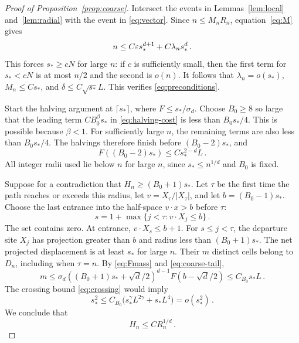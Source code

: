 \begin{proof}[Proof of Proposition~\ref{prop:coarse}]
Intersect the events in Lemmas~\ref{lem:local} and~\ref{lem:radial}
with the event in \eqref{eq:vector}.
Since $n\leq M_nR_n$, equation~\eqref{eq:M} gives
\begin{equation}\label{eq:sstar-lower}
n\leq C\varepsilon s_*^{d+1}+C\lambda_ns_*^d\, .
\end{equation}
This forces $s_*\geq cN$ for large $n$: if $c$ is sufficiently small,
then the first term for $s_*<cN$ is at most $n/2$ and the second is $o(n)$.
It follows that $\lambda_n=o(s_*)$, $M_n\leq Cs_*$, and
$\delta\leq C\sqrt{s_*}L$. This verifies \eqref{eq:preconditions}.

Start the halving argument at $\lceil s_*\rceil$, where
$F\leq s_*/\sigma_d$.
Choose $B_0\geq8$ so large that the leading term
$CB_0^\beta s_*$ in \eqref{eq:halving-cost} is less than $B_0s_*/4$.
This is possible because $\beta<1$.
For sufficiently large $n$, the remaining terms are also less than
$B_0s_*/4$. The halvings therefore finish before $(B_0-2)s_*$, and
\begin{equation}\label{eq:coarse-tail}
F((B_0-2)s_*)\leq Cs_*^{2-d}L\, .
\end{equation}
All integer radii used lie below $n$ for large $n$, since
$s_*\leq n^{1/d}$ and $B_0$ is fixed.

Suppose for a contradiction that $H_n\geq(B_0+1)s_*$.
Let $\tau$ be the first time the path reaches or exceeds this radius, let
$v=X_\tau/|X_\tau|$, and let $b=(B_0-1)s_*$.
Choose the last entrance into the half-space $v\cdot x>b$ before
$\tau$:
\begin{equation}\label{eq:coarse-entrance}
s=1+\max\{j<\tau:v\cdot X_j\leq b\}\, .
\end{equation}
The set contains zero. At entrance, $v\cdot X_s\leq b+1$.
For $s\leq j<\tau$, the departure site $X_j$ has projection greater
than $b$ and radius less than $(B_0+1)s_*$. The net projected displacement
is at least $s_*$ for large $n$.
Their $m$ distinct cells belong to $D_n$, including when $\tau=n$.
By \eqref{eq:Fmass} and \eqref{eq:coarse-tail},
\begin{equation}\label{eq:coarse-cellcount}
m\leq\sigma_d((B_0+1)s_*+\sqrt d/2)^{d-1}
F(b-\sqrt d/2)\leq C_{B_0}s_*L\, .
\end{equation}
The crossing bound \eqref{eq:crossing} would imply
\begin{equation}\label{eq:coarse-contradiction}
s_*^2\leq C_{B_0}\bigl(s_*^\gamma L^{2\gamma}+s_*L^4\bigr)
=o(s_*^2)\, .
\end{equation}
We conclude that
\begin{equation}\label{eq:HvsR}
H_n\leq CR_n^{1/d}\, .
\end{equation}


\end{proof}
